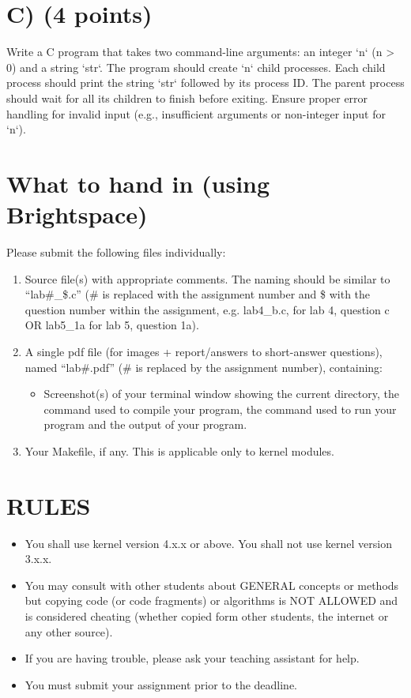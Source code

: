 \documentclass{article}
\begin{document}
\section*{C) (4 points)}
Write a C program that takes two command-line arguments: an integer `n` (n > 0) and a string `str`. The program should create `n` child processes. Each child process should print the string `str` followed by its process ID. The parent process should wait for all its children to finish before exiting.  Ensure proper error handling for invalid input (e.g., insufficient arguments or non-integer input for `n`).



\section*{What to hand in (using Brightspace)}
Please submit the following files individually:
\begin{enumerate}
    \item Source file(s) with appropriate comments. The naming should be similar to “lab\#\_\$.c” (\# is replaced with the assignment number and \$ with the question number within the assignment, e.g. lab4\_b.c, for lab 4, question c OR lab5\_1a for lab 5, question 1a).
    \item A single pdf file (for images + report/answers to short-answer questions), named “lab\#.pdf” (\# is replaced by the assignment number), containing:
    \begin{itemize}
        \item Screenshot(s) of your terminal window showing the current directory, the command used to compile your program, the command used to run your program and the output of your program.
    \end{itemize}
    \item Your Makefile, if any. This is applicable only to kernel modules.
\end{enumerate}


\section*{RULES}
\begin{itemize}
    \item You shall use kernel version 4.x.x or above. You shall not use kernel version 3.x.x.
    \item You may consult with other students about GENERAL concepts or methods but copying code (or code fragments) or algorithms is NOT ALLOWED and is considered cheating (whether copied form other students, the internet or any other source).
    \item If you are having trouble, please ask your teaching assistant for help.
    \item You must submit your assignment prior to the deadline.
\end{itemize}
\end{document}
